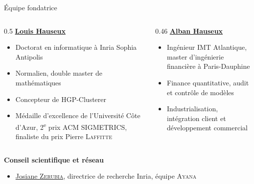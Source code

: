 \documentclass[A4,svgnames,10pt,aspectratio=169,usepdftitle=false]{beamer}
\begin{document}
\begin{frame}{Équipe fondatrice}
    \begin{columns}[T]
        \begin{column}{0.5\textwidth}
            \textbf{\bleu \href{https://www.linkedin.com/in/louis-hauseux-b80804434}{Louis Hauseux}}
            \begin{itemize}
                \item Doctorat en informatique à Inria Sophia Antipolis
                \item Normalien, double master de mathématiques
                \item Concepteur de HGP-Clusterer
                \item Médaille d'excellence de l'Université Côte d'Azur, 2\textsuperscript{e} prix ACM SIGMETRICS, finaliste du prix Pierre \textsc{Laffitte}
            \end{itemize}
        \end{column}

        \begin{column}{0.46\textwidth}
            \textbf{\bleu \href{https://www.linkedin.com/in/alban-hauseux-9577b6118/}{Alban Hauseux}}
            \begin{itemize}
                \item Ingénieur IMT Atlantique, master d'ingénierie financière à Paris-Dauphine
                \item Finance quantitative, audit et contrôle de modèles
                \item Industrialisation, intégration client et développement commercial
            \end{itemize}
        \end{column}
    \end{columns}

    \vspace{0.3cm}
    \textbf{\bleu Conseil scientifique et réseau}
    \begin{itemize}
        \item \href{https://www-sop.inria.fr/members/Josiane.Zerubia/index.html}{Josiane \textsc{Zerubia}}, directrice de recherche Inria, équipe \textsc{Ayana}
    \end{itemize}
\end{frame}
\end{document}

